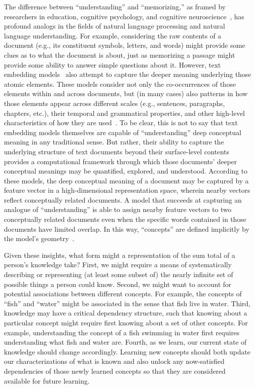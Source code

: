 \documentclass[10pt]{article}
\begin{document}
The difference between ``understanding'' and ``memorizing,'' as framed
by researchers in education, cognitive psychology, and cognitive
neuroscience~\citep[e.g.,][]{Kato40, Gall00, ScotEtal07, HallGree08,
  Macl05}, has profound analogs in the fields of natural language
processing and natural language understanding. For example,
considering the raw contents of a document (e.g., its constituent
symbols, letters, and words) might provide some clues as to what the
document is about, just as memorizing a passage might provide some
ability to answer simple questions about it. However, text embedding
models~\citep[e.g.,][]{LandDuma97, DeerEtal90, BleiEtal03,
  BleiLaff06, MikoEtal13a, CerEtal18, BrowEtal20, ViswEtal17} also
attempt to capture the deeper meaning underlying those atomic
elements. These models consider not only the co-occurrences of those
elements within and across documents, but (in many cases) also
patterns in how those elements appear across different scales (e.g.,
sentences, paragraphs, chapters, etc.), their temporal and grammatical
properties, and other high-level characteristics of
how they are used~\citep{Mann23b, Mann21a}.
To be clear, this is not to say that text embedding models themselves
are capable of ``understanding'' deep conceptual meaning in any
traditional sense. But rather, their ability to capture the underlying
structure of text documents beyond their surface-level contents
provides a computational framework through which those documents'
deeper conceptual meanings may be quantified, explored, and understood.
According to these models,
the deep conceptual meaning of a document may be captured by a feature
vector in a high-dimensional representation space, wherein nearby
vectors reflect conceptually related documents. A model that succeeds
at capturing an analogue of ``understanding'' is able to assign nearby
feature vectors to two conceptually related documents even
when the specific words contained in those documents have limited
overlap. In this way, ``concepts'' are defined implicitly by the
model's geometry~\citep[e.g., how the embedding coordinate of a given
word or document relates to the coordinates of other text
embeddings; ][]{PianHill22}.

Given these insights, what form might a representation of the sum total of a
person's knowledge take? First, we might require a means of
systematically describing or representing (at least some subset of) the nearly infinite set of possible
things a person could know. Second, we might want to account for potential
associations between different concepts. For example, the concepts of ``fish''
and ``water'' might be associated in the sense that fish live in water. Third,
knowledge may have a critical dependency structure, such that knowing about a
particular concept might require first knowing about a set of other concepts.
For example, understanding the concept of a fish swimming in water first
requires understanding what fish and water are. Fourth, as we learn,
our current state of knowledge should change accordingly. Learning new
concepts should both update our characterizations of what is known and also
unlock any now-satisfied dependencies of those newly learned concepts so that
they are considered available for future learning.
\end{document}
